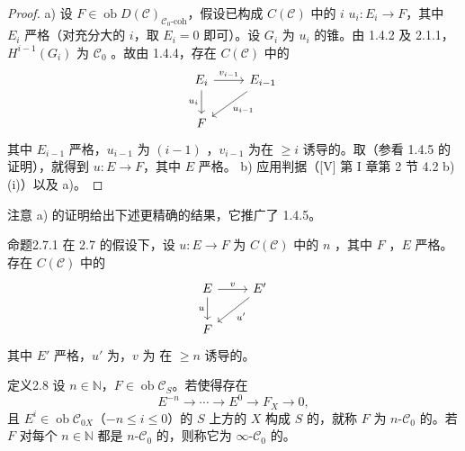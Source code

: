 \begin{proof}
a) 设 $F\in\operatorname{ob}D(\mathscr C)_{\mathscr C_0\text{-coh}}$，假设已构成 $C(\mathscr C)$ 中的 $i$  $u_i:E_i\to F$，其中 $E_i$ 严格（对充分大的 $i$，取 $E_i=0$ 即可）。设 $G_i$ 为 $u_i$ 的锥。由 1.4.2 及 2.1.1，$H^{i-1}(G_i)$ 为 $\mathscr C_0$ 。故由 1.4.4，存在 $C(\mathscr C)$ 中的
\[\begin{tikzcd}E_i\arrow[r,"v_{i-1}"]\arrow[d,"u_i"']&E_{i-1}\arrow[dl,"u_{i-1}"]\\F&\end{tikzcd}\]
其中 $E_{i-1}$ 严格，$u_{i-1}$ 为 $(i-1)$ ，$v_{i-1}$ 为在 $\geq i$ 诱导的。取（参看 1.4.5 的证明），就得到 $u:E\to F$，其中 $E$ 严格。
b) 应用判据（[V] 第 I 章第 2 节 4.2 b)(i)）以及 a)。
\end{proof}
注意 a) 的证明给出下述更精确的结果，它推广了 1.4.5。
\begin{SGAresult}{命题}{2.7.1}
在 2.7 的假设下，设 $u:E\to F$ 为 $C(\mathscr C)$ 中的 $n$ ，其中 $F$ ，$E$ 严格。存在 $C(\mathscr C)$ 中的
\[\begin{tikzcd}E\arrow[r,"v"]\arrow[d,"u"']&E'\arrow[dl,"u'"]\\F&\end{tikzcd}\]
其中 $E'$ 严格，$u'$ 为，$v$ 为
在 $\geq n$ 诱导的。
\end{SGAresult}
\begin{SGAresult}{定义}{2.8}
设 $n\in\mathbb N$，$F\in\operatorname{ob}\mathscr C_S$。若使得存在
\[E^{-n}\longrightarrow\cdots\longrightarrow E^0\longrightarrow F_X\longrightarrow0,\]
且 $E^i\in\operatorname{ob}\mathscr C_{0X}$（$-n\leq i\leq0$）的 $S$ 上方的 $X$ 构成 $S$ 的，就称 $F$ 为 $n$-$\mathscr C_0$ 的。若 $F$ 对每个 $n\in\mathbb N$ 都是 $n$-$\mathscr C_0$ 的，则称它为 $\infty$-$\mathscr C_0$ 的。
\end{SGAresult}
